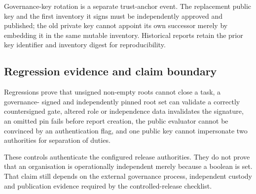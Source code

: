 Governance-key rotation is a separate trust-anchor event.  The replacement public
key and the first inventory it signs must be independently approved and published;
the old private key cannot appoint its own successor merely by embedding it in the
same mutable inventory.  Historical reports retain the prior key identifier and
inventory digest for reproducibility.

\subsection{Regression evidence and claim boundary}

Regressions prove that unsigned non-empty roots cannot close a task, a governance-
signed and independently pinned root set can validate a correctly countersigned
gate, altered role or independence data invalidates the signature, an omitted pin
fails before report creation, the public evaluator cannot be convinced by an
authentication flag, and one public key cannot impersonate two authorities for
separation of duties.

These controls authenticate the configured release authorities.  They do not prove
that an organisation is operationally independent merely because a boolean is set.
That claim still depends on the external governance process, independent custody
and publication evidence required by the controlled-release checklist.
